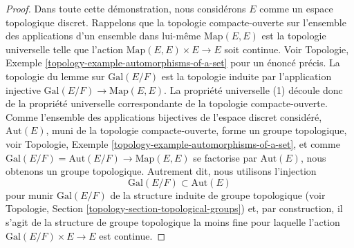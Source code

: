 \begin{proof}
Dans toute cette démonstration, nous considérons $E$ comme un espace topologique discret.
Rappelons que la topologie compacte-ouverte sur l'ensemble des applications d'un ensemble dans lui-même
$\text{Map}(E, E)$ est la topologie universelle telle que l'action
$\text{Map}(E, E) \times E \to E$ soit continue. Voir
Topologie, Exemple \ref{topology-example-automorphisms-of-a-set}
pour un énoncé précis. La topologie du lemme sur
$\text{Gal}(E/F)$ est la topologie induite par l'application injective
$\text{Gal}(E/F) \to \text{Map}(E, E)$.
La propriété universelle (1) découle donc de la propriété universelle
correspondante de la topologie compacte-ouverte.
Comme l'ensemble des applications bijectives de l'espace discret considéré, $\text{Aut}(E)$,
muni de la topologie compacte-ouverte, forme un groupe topologique, voir
Topologie, Exemple \ref{topology-example-automorphisms-of-a-set},
et comme $\text{Gal}(E/F) = \text{Aut}(E/F) \to \text{Map}(E, E)$
se factorise par $\text{Aut}(E)$, nous obtenons un groupe topologique.
Autrement dit, nous utilisons l'injection
$$
\text{Gal}(E/F) \subset \text{Aut}(E)
$$
pour munir $\text{Gal}(E/F)$ de la structure induite de groupe topologique
(voir Topologie, Section \ref{topology-section-topological-groups})
et, par construction, il s'agit de la structure de groupe topologique
la moins fine pour laquelle l'action $\text{Gal}(E/F) \times E \to E$ est continue.


\end{proof}
